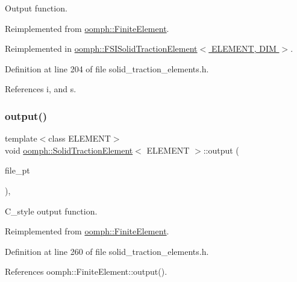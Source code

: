 Output function. 



Reimplemented from \hyperlink{classoomph_1_1FiniteElement_afa9d9b2670f999b43e6679c9dd28c457}{oomph\+::\+Finite\+Element}.



Reimplemented in \hyperlink{classoomph_1_1FSISolidTractionElement_a8f4008e86ceefec5f6678cdf37e49eb8}{oomph\+::\+F\+S\+I\+Solid\+Traction\+Element$<$ E\+L\+E\+M\+E\+N\+T, D\+I\+M $>$}.



Definition at line 204 of file solid\+\_\+traction\+\_\+elements.\+h.



References i, and s.

\mbox{\label{classoomph_1_1SolidTractionElement_adad3b3f82a9537c6fbe172143d5f6c44}} 
\subsubsection{\texorpdfstring{output()}{output()}\hspace{0.1cm}{\footnotesize\ttfamily [3/4]}}
{\footnotesize\ttfamily template$<$class E\+L\+E\+M\+E\+NT$>$ \\
void \hyperlink{classoomph_1_1SolidTractionElement}{oomph\+::\+Solid\+Traction\+Element}$<$ E\+L\+E\+M\+E\+NT $>$\+::output (\begin{DoxyParamCaption}\item[{F\+I\+LE $\ast$}]{file\+\_\+pt }\end{DoxyParamCaption})\hspace{0.3cm}{\ttfamily [inline]}, {\ttfamily [virtual]}}



C\+\_\+style output function. 



Reimplemented from \hyperlink{classoomph_1_1FiniteElement_a72cddd09f8ddbee1a20a1ff404c6943e}{oomph\+::\+Finite\+Element}.



Definition at line 260 of file solid\+\_\+traction\+\_\+elements.\+h.



References oomph\+::\+Finite\+Element\+::output().

